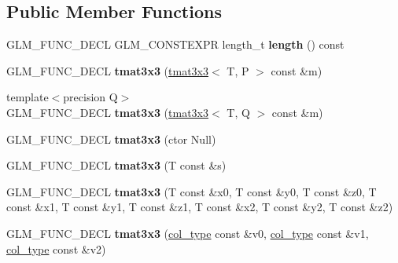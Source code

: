 \subsection*{Public Member Functions}
\begin{DoxyCompactItemize}
\item 
G\+L\+M\+\_\+\+F\+U\+N\+C\+\_\+\+D\+E\+CL G\+L\+M\+\_\+\+C\+O\+N\+S\+T\+E\+X\+PR length\+\_\+t {\bfseries length} () const \hypertarget{structglm_1_1detail_1_1tmat3x3_a5e59538a93a3039a7c6d58ce50bfd310}{}\label{structglm_1_1detail_1_1tmat3x3_a5e59538a93a3039a7c6d58ce50bfd310}

\item 
G\+L\+M\+\_\+\+F\+U\+N\+C\+\_\+\+D\+E\+CL {\bfseries tmat3x3} (\hyperlink{structglm_1_1detail_1_1tmat3x3}{tmat3x3}$<$ T, P $>$ const \&m)\hypertarget{structglm_1_1detail_1_1tmat3x3_ad29c55dfadf40179fd4d911535465f6c}{}\label{structglm_1_1detail_1_1tmat3x3_ad29c55dfadf40179fd4d911535465f6c}

\item 
{\footnotesize template$<$precision Q$>$ }\\G\+L\+M\+\_\+\+F\+U\+N\+C\+\_\+\+D\+E\+CL {\bfseries tmat3x3} (\hyperlink{structglm_1_1detail_1_1tmat3x3}{tmat3x3}$<$ T, Q $>$ const \&m)\hypertarget{structglm_1_1detail_1_1tmat3x3_a088a58e6773a067fdf873610d46283c1}{}\label{structglm_1_1detail_1_1tmat3x3_a088a58e6773a067fdf873610d46283c1}

\item 
G\+L\+M\+\_\+\+F\+U\+N\+C\+\_\+\+D\+E\+CL {\bfseries tmat3x3} (ctor Null)\hypertarget{structglm_1_1detail_1_1tmat3x3_ac542e26b78b276165616b75632e45f4b}{}\label{structglm_1_1detail_1_1tmat3x3_ac542e26b78b276165616b75632e45f4b}

\item 
G\+L\+M\+\_\+\+F\+U\+N\+C\+\_\+\+D\+E\+CL {\bfseries tmat3x3} (T const \&s)\hypertarget{structglm_1_1detail_1_1tmat3x3_a4c126cf2520005853e4ce6e4689906c6}{}\label{structglm_1_1detail_1_1tmat3x3_a4c126cf2520005853e4ce6e4689906c6}

\item 
G\+L\+M\+\_\+\+F\+U\+N\+C\+\_\+\+D\+E\+CL {\bfseries tmat3x3} (T const \&x0, T const \&y0, T const \&z0, T const \&x1, T const \&y1, T const \&z1, T const \&x2, T const \&y2, T const \&z2)\hypertarget{structglm_1_1detail_1_1tmat3x3_a879a2f7f841b7fc8c801d9bc3e0b272b}{}\label{structglm_1_1detail_1_1tmat3x3_a879a2f7f841b7fc8c801d9bc3e0b272b}

\item 
G\+L\+M\+\_\+\+F\+U\+N\+C\+\_\+\+D\+E\+CL {\bfseries tmat3x3} (\hyperlink{structglm_1_1detail_1_1tvec3}{col\+\_\+type} const \&v0, \hyperlink{structglm_1_1detail_1_1tvec3}{col\+\_\+type} const \&v1, \hyperlink{structglm_1_1detail_1_1tvec3}{col\+\_\+type} const \&v2)\hypertarget{structglm_1_1detail_1_1tmat3x3_afcb075377787c4e8252bd0691658239e}{}\label{structglm_1_1detail_1_1tmat3x3_afcb075377787c4e8252bd0691658239e}


\end{DoxyCompactItemize}
